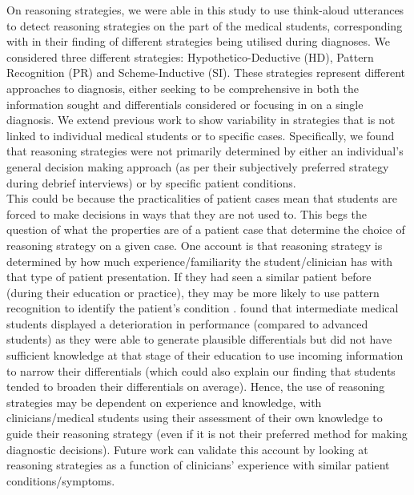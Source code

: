 \documentclass[a4paper, nobind]{templates/ociamthesis}
\begin{document}
On reasoning strategies, we were able in this study to use think-aloud utterances to detect reasoning strategies on the part of the medical students, corresponding with \textcite{coderre_diagnostic_2003} in their finding of different strategies being utilised during diagnoses. We considered three different strategies: Hypothetico-Deductive (HD), Pattern Recognition (PR) and Scheme-Inductive (SI). These strategies represent different approaches to diagnosis, either seeking to be comprehensive in both the information sought and differentials considered or focusing in on a single diagnosis. We extend previous work to show variability in strategies that is not linked to individual medical students or to specific cases. Specifically, we found that reasoning strategies were not primarily determined by either an individual's general decision making approach (as per their subjectively preferred strategy during debrief interviews) or by specific patient conditions.\\

This could be because the practicalities of patient cases mean that students are forced to make decisions in ways that they are not used to. This begs the question of what the properties are of a patient case that determine the choice of reasoning strategy on a given case. One account is that reasoning strategy is determined by how much experience/familiarity the student/clinician has with that type of patient presentation. If they had seen a similar patient before (during their education or practice), they may be more likely to use pattern recognition to identify the patient's condition \autocite{nendaz_diagnostic_2012}. \textcite{arocha_novice_1995} found that intermediate medical students displayed a deterioration in performance (compared to advanced students) as they were able to generate plausible differentials but did not have sufficient knowledge at that stage of their education to use incoming information to narrow their differentials (which could also explain our finding that students tended to broaden their differentials on average). Hence, the use of reasoning strategies may be dependent on experience and knowledge, with clinicians/medical students using their assessment of their own knowledge to guide their reasoning strategy (even if it is not their preferred method for making diagnostic decisions). Future work can validate this account by looking at reasoning strategies as a function of clinicians' experience with similar patient conditions/symptoms.\\
\end{document}
